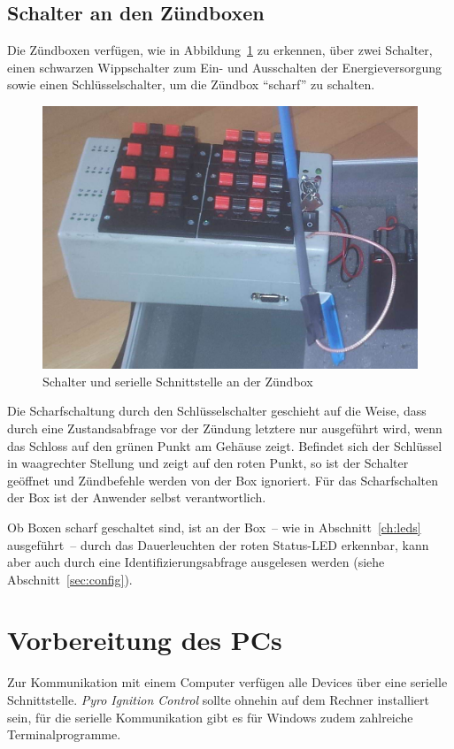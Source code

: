 \documentclass[paper=a4, parskip, numbers=noenddot, toc=listof, headsepline]{scrbook}
\newcommand{\pic}{\emph{Pyro Ignition Control}}
\begin{document}
		\section{Schalter an den Zündboxen}

			Die Zündboxen verfügen, wie in Abbildung~\ref{fig:schalterzuend} zu erkennen, über zwei Schalter, einen schwarzen Wippschalter zum Ein- und Ausschalten der Energieversorgung sowie einen Schlüsselschalter, um die Zündbox \enquote{scharf} zu schalten.

			\begin{figure}[!b]
				\centering
				\includegraphics[width=.6\textwidth]{Bilder/SchalterZuendbox}
				\caption{Schalter und serielle Schnittstelle an der Zündbox}
				\label{fig:schalterzuend}
			\end{figure}

			Die Scharfschaltung durch den Schlüsselschalter geschieht auf die Weise, dass durch eine Zustandsabfrage vor der Zündung letztere nur ausgeführt wird, wenn das Schloss auf den grünen Punkt am Gehäuse zeigt. Befindet sich der Schlüssel in waagrechter Stellung und zeigt auf den roten Punkt, so ist der Schalter geöffnet und Zündbefehle werden von der Box ignoriert. Für das Scharfschalten der Box ist der Anwender selbst verantwortlich.

			Ob Boxen scharf geschaltet sind, ist an der Box~-- wie in Abschnitt~\ref{ch:leds} ausgeführt~-- durch das Dauerleuchten der roten Status-LED erkennbar, kann aber auch durch eine Identifizierungsabfrage ausgelesen werden (siehe Abschnitt~\ref{sec:config}).

	\chapter{Vorbereitung des PCs}

		Zur Kommunikation mit einem Computer verfügen alle Devices über eine serielle Schnittstelle. {\pic} sollte ohnehin auf dem Rechner installiert sein, für die serielle Kommunikation gibt es für Windows zudem zahlreiche Terminalprogramme.
\end{document}
